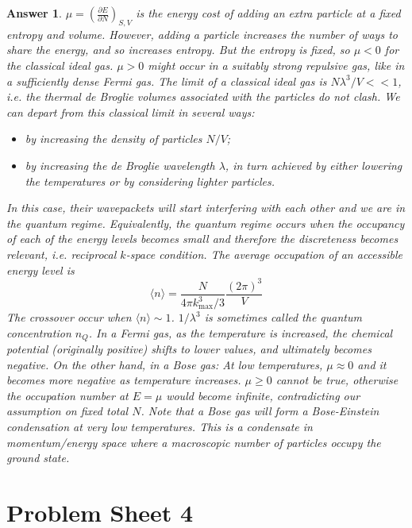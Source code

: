 \documentclass[a4paper]{article}
\newtheorem{ans}{Answer}[section]
\theoremstyle{new}
\begin{document}
\begin{ans}
$\mu=(\frac{\partial E}{\partial N})_{S,V}$ is the energy cost of adding an extra particle at a fixed entropy and volume. However, adding a particle increases the number of ways to share the energy, and so increases entropy. But the entropy is fixed, so $\mu<0$ for the classical ideal gas. $\mu>0$ might occur in a suitably strong repulsive gas, like in a sufficiently dense Fermi gas. The limit of a classical ideal gas is $N\lambda^3/V<<1$, i.e. the thermal de Broglie volumes associated with the particles do not clash. We can depart from this classical limit in several ways:
\begin{itemize}
    \item by increasing the density of particles $N/V$;
    \item by increasing the de Broglie wavelength $\lambda$, in turn achieved by either lowering the temperatures or by considering lighter particles.
\end{itemize}
In this case, their wavepackets will start interfering with each other and we are in the quantum regime. Equivalently, the quantum regime occurs when the occupancy of each of the energy levels becomes small and therefore the discreteness becomes relevant, i.e. reciprocal $k$-space condition. The average occupation of an accessible energy level is
$$\langle n\rangle=\frac{N}{4\pi k_{\text{max}}^3/3}\frac{(2\pi)^3}{V}$$
The crossover occur when $\langle n\rangle\sim 1$. $1/\lambda^3$ is sometimes called the quantum concentration $n_Q$. In a Fermi gas, as the temperature is increased, the chemical potential (originally positive) shifts to lower values, and ultimately becomes negative. On the other hand, in a Bose gas: At low temperatures, $\mu\approx 0$ and it becomes more negative as temperature increases. $\mu\geq0$ cannot be true, otherwise the occupation number at $E=\mu$ would become infinite, contradicting our assumption on fixed total $N$. Note that a Bose gas will form a Bose-Einstein condensation at very low temperatures. This is a condensate in momentum/energy space where a macroscopic number of particles occupy the ground state.
\end{ans}

\newpage
\section{Problem Sheet 4}
\end{document}
